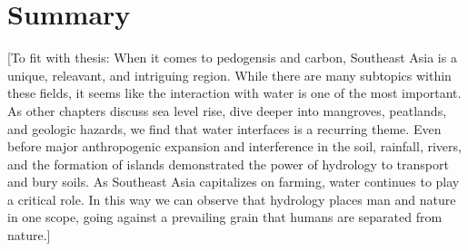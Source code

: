 \section{Summary}
[To fit with thesis: When it comes to pedogensis and carbon, Southeast Asia is a unique, releavant, and intriguing region. While there are many subtopics within these fields, it seems like the interaction with water is one of the most important. As other chapters discuss sea level rise, dive deeper into mangroves, peatlands, and geologic hazards, we find that water interfaces is a recurring theme. Even before major anthropogenic expansion and interference in the soil, rainfall, rivers, and the formation of islands demonstrated the power of hydrology to transport and bury soils. As Southeast Asia capitalizes on farming, water continues to play a critical role. In this way we can observe that hydrology places man and nature in one scope, going against a prevailing grain that humans are separated from nature.]
